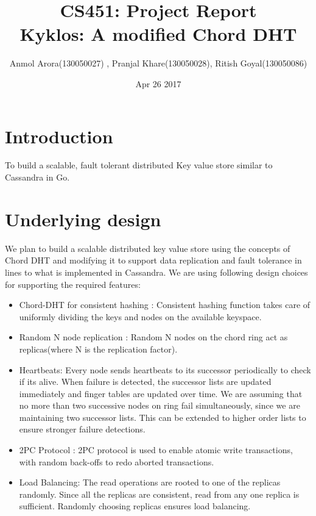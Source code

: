 \documentclass{article}
\begin{document}
\author{Anmol Arora(130050027) , Pranjal Khare(130050028), Ritish Goyal(130050086)}
\title{CS451: Project Report   \\
    Kyklos: A modified Chord DHT}
\date{Apr 26 2017}
\maketitle

\section{Introduction}
 To build a scalable, fault tolerant distributed Key value store similar to Cassandra in Go.

\section{Underlying design}
We plan to build a scalable distributed key value store using the concepts of Chord DHT and modifying it to support data replication and fault tolerance in lines to what is implemented in Cassandra.
We are using following design choices for supporting the required features:
\begin{itemize}
    \item Chord-DHT for consistent hashing : Consistent hashing function takes care of uniformly dividing the keys and nodes on the available keyspace.
    \item Random N node replication : Random N nodes on the chord ring act as replicas(where N is the replication factor).
    \item Heartbeats: Every node sends heartbeats to its successor periodically to check if its alive. When failure is detected, the successor lists are updated immediately and finger tables are updated over time. We are assuming that no more than two successive nodes on ring fail simultaneously, since we are maintaining two successor lists. This can be extended to higher order lists to ensure stronger failure detections.
    \item 2PC Protocol : 2PC protocol is used to enable atomic write transactions, with random back-offs to redo aborted transactions.
    \item Load Balancing: The read operations are rooted to one of the replicas randomly. Since all the replicas are consistent, read from any one replica is sufficient. Randomly choosing replicas ensures load balancing.
\end{itemize}
\end{document}
